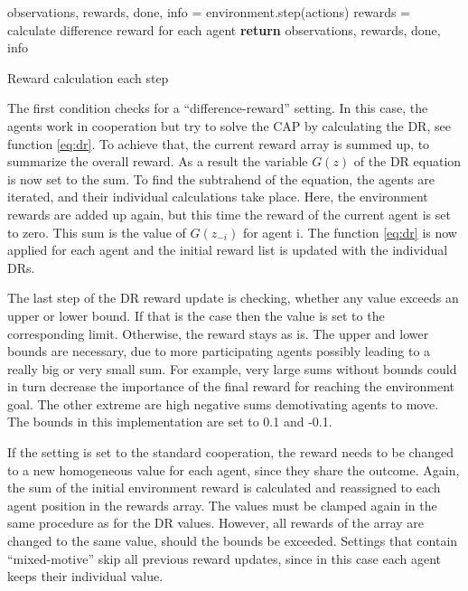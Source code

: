 \begin{algorithm}[H]
    \DontPrintSemicolon
    observations, rewards, done, info = environment.step(actions)\;
    \;
     {
        rewards = calculate difference reward for each agent
    }
    \;
    \;
    \;
    \textbf{return} observations, rewards, done, info\;
    \caption{Reward calculation each step}\label{algo:step_reward}
\end{algorithm}

The first condition checks for a ``difference-reward'' setting. In this case, the agents work in cooperation but try to solve the CAP by calculating the DR, see function \eqref{eq:dr}. To achieve that, the current reward array is summed up, to summarize the overall reward. As a result the variable $G(z)$ of the DR equation is now set to the sum. To find the subtrahend of the equation, the agents are iterated, and their individual calculations take place. Here, the environment rewards are added up again, but this time the reward of the current agent is set to zero. This sum is the value of $G(z_{-i})$ for agent i. The function \eqref{eq:dr} is now applied for each agent and the initial reward list is updated with the individual DRs. 

The last step of the DR reward update is checking, whether any value exceeds an upper or lower bound. If that is the case then the value  is set to the corresponding limit. Otherwise, the reward stays as is. The upper and lower bounds are necessary, due to more participating agents possibly leading to a really big or very small sum. For example, very large sums without bounds could in turn decrease the importance of the final reward for reaching the environment goal. The other extreme are high negative sums demotivating agents to move. The bounds in this implementation are set to 0.1 and -0.1.

If the setting is set to the standard cooperation, the reward needs to be changed to a new homogeneous value for each agent, since they share the outcome. Again, the sum of the initial environment reward is calculated and reassigned to each agent position in the rewards array. The values must be clamped again in the same procedure as for the DR values. However, all rewards of the array are changed to the same value, should the bounds be exceeded. Settings that contain ``mixed-motive'' skip all previous reward updates, since in this case each agent keeps their individual value.

